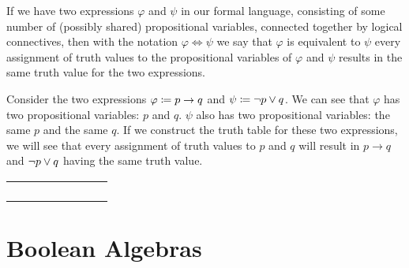 \begin{definition}[Equivalence]
    If we have two expressions \(\varphi\) and \(\psi\) in our formal language,
    consisting of some number of (possibly shared) propositional variables, connected together by logical connectives,
    then with the notation \(\varphi \iff \psi\) we say that \(\varphi\) is equivalent to \(\psi\)
    \iffbydefn every assignment of truth values to the propositional variables of \(\varphi\) and \(\psi\) results
    in the same truth value for the two expressions.
\end{definition}
\begin{example}
    Consider the two expressions \(\varphi \coloneqq p \rightarrow q\) and \(\psi \coloneqq \neg p \vee q\).
    We can see that \(\varphi\) has two propositional variables: \(p\) and \(q\).
    \(\psi\) also has two propositional variables: the same \(p\) and the same \(q\).
    If we construct the truth table for these two expressions,
    we will see that every assignment of truth values to \(p\) and \(q\) will result in \(p \rightarrow q\) and \(\neg p \vee q\)
    having the same truth value.

    \begin{table}[H]
        \centering
        \begin{tabular}{|CcCc||CcCc|}
            \hline
             &  &  & \\ \hline
            \thead{\(\top\)} & \thead{\(\top\)} &  & \\
            \thead{\(\top\)} & \thead{\(\bot\)} &  & \\
            \thead{\(\bot\)} & \thead{\(\top\)} &  &  \\
            \thead{\(\bot\)} & \thead{\(\bot\)} &  &  \\ \hline
        \end{tabular}
    \end{table}
\end{example}

\newpage
\section{Boolean Algebras}


